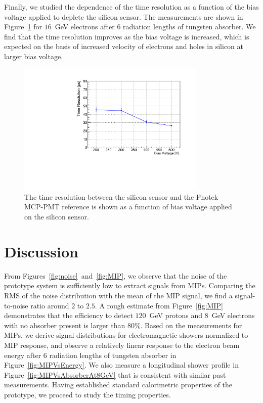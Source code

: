 \documentclass[12pt]{article}
\begin{document}
{Finally, we studied the dependence of the time resolution as a function of the
bias voltage applied to deplete the silicon sensor. The measurements are shown
in Figure~\ref{fig:SigmaT_vs_DV_lin30Stamp} for $16$~GeV electrons after
6 radiation lengths of tungsten absorber. We find that the time resolution
improves as the bias voltage is increased, which is expected on the basis of 
increased velocity of electrons and holes in silicon at larger bias voltage. 

\begin{figure}[htbp] 
\centering
\includegraphics[width=0.8\textwidth]{plots/SigmaT_vs_DV_lin30Stamp.pdf} 
\caption{The time resolution between the silicon sensor and the Photek MCP-PMT 
reference is shown as a function of bias voltage applied on the silicon sensor. } 
\label{fig:SigmaT_vs_DV_lin30Stamp} 
\end{figure} 

\section{Discussion} 
\label{sec:discussion} 

From Figures~\ref{fig:noise}~and~\ref{fig:MIP}, we observe that the noise of the
prototype system is sufficiently low to extract signals from MIPs. Comparing
the RMS of the noise distribution with the mean of the MIP signal, we find a
signal-to-noise ratio around $2$ to $2.5$. A rough estimate from 
Figure~\ref{fig:MIP} demonstrates that the efficiency to detect $120$~GeV protons
and $8$~GeV electrons with no absorber present is larger than $80\%$.
Based on the measurements for MIPs, we derive signal distributions for
electromagnetic showers normalized to MIP response, and observe
a relatively linear response to the electron beam energy after 6 radiation lengths 
of tungsten absorber in Figure~\ref{fig:MIPVsEnergy}. We also measure a 
longitudinal shower profile in Figure~\ref{fig:MIPVsAbsorberAt8GeV} 
that is consistent with similar past measurements. Having established 
standard calorimetric properties of the prototype, we proceed to study 
the timing properties. 

}
\end{document}
